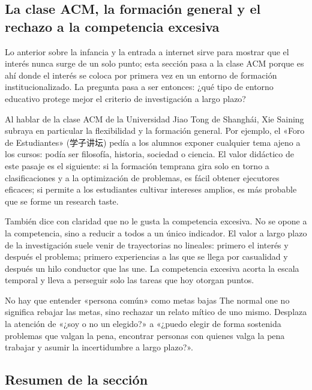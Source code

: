 \documentclass[a4paper]{article}
\begin{document}
\subsection{La clase ACM, la formación general y el rechazo a la competencia excesiva}

Lo anterior sobre la infancia y la entrada a internet sirve para mostrar que el interés nunca surge de un solo punto; esta sección pasa a la clase ACM porque es ahí donde el interés se coloca por primera vez en un entorno de formación institucionalizado. La pregunta pasa a ser entonces: ¿qué tipo de entorno educativo protege mejor el criterio de investigación a largo plazo?

Al hablar de la clase ACM de la Universidad Jiao Tong de Shanghái, Xie Saining subraya en particular la flexibilidad y la formación general. Por ejemplo, el «Foro de Estudiantes» (学子讲坛) pedía a los alumnos exponer cualquier tema ajeno a los cursos: podía ser filosofía, historia, sociedad o ciencia. El valor didáctico de este pasaje es el siguiente: si la formación temprana gira solo en torno a clasificaciones y a la optimización de problemas, es fácil obtener ejecutores eficaces; si permite a los estudiantes cultivar intereses amplios, es más probable que se forme un research taste.

También dice con claridad que no le gusta la competencia excesiva. No se opone a la competencia, sino a reducir a todos a un único indicador. El valor a largo plazo de la investigación suele venir de trayectorias no lineales: primero el interés y después el problema; primero experiencias a las que se llega por casualidad y después un hilo conductor que las une. La competencia excesiva acorta la escala temporal y lleva a perseguir solo las tareas que hoy otorgan puntos.

\begin{warningbox}{No hay que entender «persona común» como metas bajas}
The normal one no significa rebajar las metas, sino rechazar un relato mítico de uno mismo. Desplaza la atención de «¿soy o no un elegido?» a «¿puedo elegir de forma sostenida problemas que valgan la pena, encontrar personas con quienes valga la pena trabajar y asumir la incertidumbre a largo plazo?».
\end{warningbox}

\subsection{Resumen de la sección}
\end{document}
